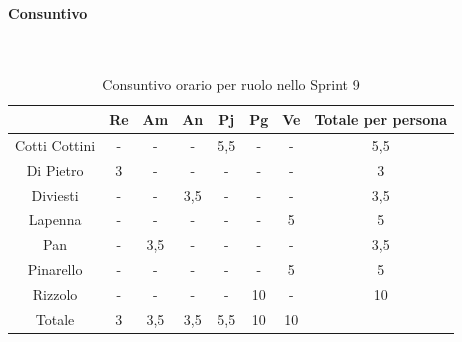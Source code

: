 \documentclass{article}
\begin{document}
                \paragraph{Consuntivo}\mbox{}\\
                \begin{table}[H]
                    \centering
                    \begin{tabular}{|c|c|c|c|c|c|c|c|}
                    \hline
                                    & Re  & Am  & An  & Pj  & Pg  & Ve  & Totale per persona \\ \hline
                    Cotti Cottini & -   & -   & -   & 5,5 & -   & -   & 5,5                \\ \hline
                    Di Pietro     & 3   & -   & -   & -   & -   & -   & 3                  \\ \hline
                    Diviesti      & -   & -   & 3,5 & -   & -   & -   & 3,5                \\ \hline
                    Lapenna       & -   & -   & -   & -   & -   & 5   & 5                  \\ \hline
                    Pan           & -   & 3,5 & -   & -   & -   & -   & 3,5                \\ \hline
                    Pinarello     & -   & -   & -   & -   & -   & 5   & 5                  \\ \hline
                    Rizzolo       & -   & -   & -   & -   & 10  & -   & 10                 \\ \hline
                    Totale        & 3   & 3,5 & 3,5 & 5,5 & 10  & 10  &                    \\ \hline
                    \end{tabular}
                    \caption{Consuntivo orario per ruolo nello Sprint 9}
                \end{table}

\end{document}
